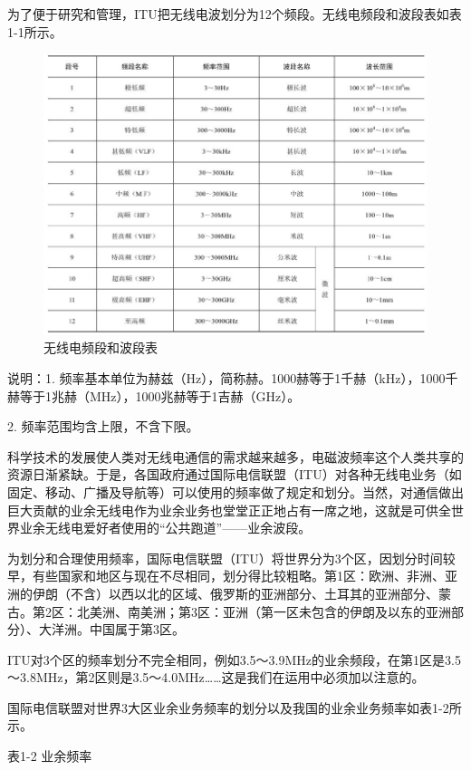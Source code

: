 \documentclass[12pt,UTF8]{ctexbook}
\begin{document}
为了便于研究和管理，ITU把无线电波划分为12个频段。无线电频段和波段表如表1-1所示。

\begin{figure}[htbp]
	\centering
	\includegraphics[width=0.7\linewidth]{79}
	\caption{无线电频段和波段表}
	\label{fig:1}
\end{figure}

说明：1. 频率基本单位为赫兹（Hz），简称赫。1000赫等于1千赫（kHz），1000千赫等于1兆赫（MHz），1000兆赫等于1吉赫（GHz）。

2. 频率范围均含上限，不含下限。

科学技术的发展使人类对无线电通信的需求越来越多，电磁波频率这个人类共享的资源日渐紧缺。于是，各国政府通过国际电信联盟（ITU）对各种无线电业务（如固定、移动、广播及导航等）可以使用的频率做了规定和划分。当然，对通信做出巨大贡献的业余无线电作为业余业务也堂堂正正地占有一席之地，这就是可供全世界业余无线电爱好者使用的“公共跑道”——业余波段。

为划分和合理使用频率，国际电信联盟（ITU）将世界分为3个区，因划分时间较早，有些国家和地区与现在不尽相同，划分得比较粗略。第1区：欧洲、非洲、亚洲的伊朗（不含）以西以北的区域、俄罗斯的亚洲部分、土耳其的亚洲部分、蒙古。第2区：北美洲、南美洲；第3区：亚洲（第一区未包含的伊朗及以东的亚洲部分）、大洋洲。中国属于第3区。

ITU对3个区的频率划分不完全相同，例如3.5～3.9MHz的业余频段，在第1区是3.5～3.8MHz，第2区则是3.5～4.0MHz……这是我们在运用中必须加以注意的。

国际电信联盟对世界3大区业余业务频率的划分以及我国的业余业务频率如表1-2所示。

表1-2 业余频率
\end{document}
